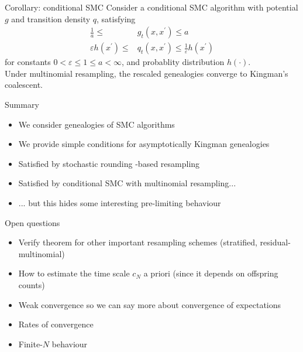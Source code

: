 \documentclass[aspectratio=169]{beamer}
\theoremstyle{definition}
\begin{document}
\begin{frame}{Corollary: conditional SMC}
Consider a conditional SMC algorithm with potential $g$ and transition density $q$, satisfying
\begin{align*}
\frac{1}{a} \leq &g_t(x, x^\prime) \leq a \\
\varepsilon h(x^\prime) \leq &q_t(x, x^\prime) \leq \frac{1}{\varepsilon} h(x^\prime) 
\end{align*}
for constants $0<\varepsilon\leq 1\leq a<\infty$, and probablity distribution $h(\cdot)$.\\[10pt]

Under multinomial resampling, the rescaled genealogies converge to Kingman's coalescent.
\end{frame}



\begin{frame}{Summary}
\begin{itemize}
\item We consider genealogies of SMC algorithms
\item We provide simple conditions for asymptotically Kingman genealogies
\item Satisfied by stochastic rounding -based resampling
\item Satisfied by conditional SMC with multinomial resampling...
\item ... but this hides some interesting pre-limiting behaviour
\end{itemize}
\end{frame}

\begin{frame}{Open questions}
\begin{itemize}
\item Verify theorem for other important resampling schemes (stratified, residual-multinomial)
\item How to estimate the time scale $c_N$ a priori (since it depends on offspring counts)
\item Weak convergence so we can say more about convergence of expectations
\item Rates of convergence
\item Finite-$N$ behaviour
\end{itemize}
\end{frame}
\end{document}
